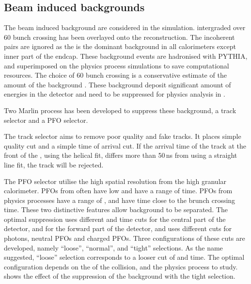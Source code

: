 \subsection{Beam induced backgrounds}
\label{sec:pandoraggHad}

The beam induced background are considered in the simulation. \ggHad intergraded over 60 bunch crossing has been overlayed onto the reconstruction. The incoherent pairs are ignored as the \ggHad is the dominant background in all calorimeters except inner part of the \HCAL endcap. These \ggHad background events are hadronised with PYTHIA, and superimposed on the physics process simulations to save computational resources. The choice of 60 bunch crossing is a conservative estimate  of  the amount of the background \cite{Barklow:1443518,Barklow:1443518}. These background deposit significant amount of energies in the detector and need to be suppressed for physics analysis in .

Two Marlin process has been developed to suppress these background, a track selector and a PFO selector\cite{Marshall:2012ry}.

The track selector aims to remove poor quality and fake tracks. It places simple quality cut and a simple time of arrival cut. If the arrival time of the track at the front of the \ECAL, using the helical fit, differs more than 50\,ns from using a straight line fit, the track will be rejected.

The PFO selector utilise the high spatial resolution from the high granular calorimeter. PFOs from \ggHad often have low \pT and have a range of time. PFOs from physics processes have a range of \pT, and have time close to the brunch crossing time. These two distinctive features allow \ggHad background to be separated. The optimal suppression uses different \pT and time cuts for the central part of the detector, and for the forward part of the detector, and uses different cuts for photons, neutral PFOs and charged PFOs. Three configurations of these cuts are developed, namely ``loose'', ``normal'', and ``tight'' selections. As the name suggested, ``loose'' selection corresponds to a looser cut of \pT and time. The optimal configuration depends on the \sqrtS of the collision, and the physics process to study.  shows the effect of the suppression of the background with the tight \PFO selection.

